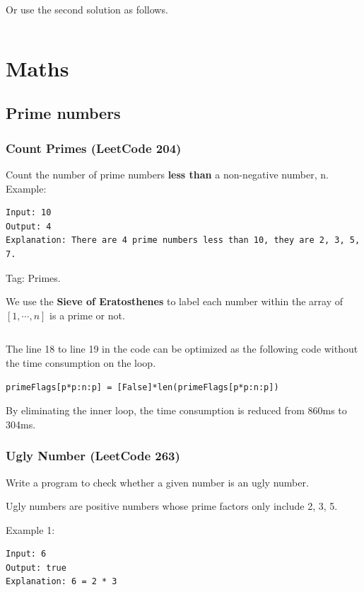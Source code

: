 \documentclass[11pt]{article}
\begin{document}
\inputminted[breaklines=true,frame=leftline, linenos=true]{python}{src/subarraysDivByK.py}

Or use the second solution as follows.
\inputminted[breaklines=true,frame=leftline, linenos=true]{python}{src/subarraysDivByK2.py}

\section{Maths}
\subsection{Prime numbers}
\subsubsection{Count Primes (LeetCode 204)}
Count the number of prime numbers \textbf{less than} a non-negative number, n.
Example:
\begin{verbatim}
Input: 10
Output: 4
Explanation: There are 4 prime numbers less than 10, they are 2, 3, 5, 7.
\end{verbatim}

Tag: Primes.

We use the \textbf{Sieve of Eratosthenes} to label each number within the array of $[1, \cdots, n]$ is a prime or not.
\inputminted[breaklines=true,frame=leftline, linenos=true]{python}{src/countPrimes.py}

The line 18 to line 19 in the code can be optimized as the following code without the time consumption on the loop. 
\begin{verbatim}
primeFlags[p*p:n:p] = [False]*len(primeFlags[p*p:n:p])	
\end{verbatim}

By eliminating the inner loop, the time consumption is reduced from 860ms to 304ms. 

\subsubsection{Ugly Number (LeetCode 263)}
Write a program to check whether a given number is an ugly number.

Ugly numbers are positive numbers whose prime factors only include 2, 3, 5.

Example 1:
\begin{verbatim}
Input: 6
Output: true
Explanation: 6 = 2 * 3
\end{verbatim}
\end{document}
